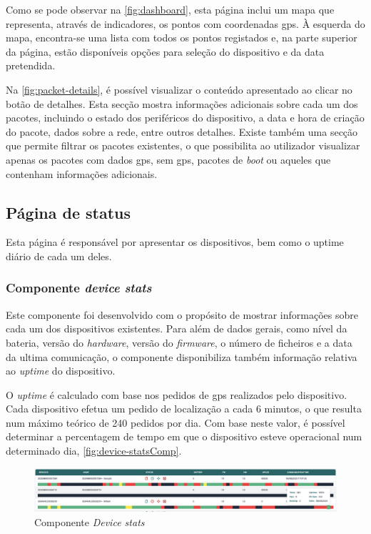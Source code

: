Como se pode observar na \autoref{fig:dashboard}, esta página inclui um mapa que representa, através de indicadores, os pontos com coordenadas \acs{gps}. À esquerda do mapa, encontra-se uma lista com todos os pontos registados e, na parte superior da página, estão disponíveis opções para seleção do dispositivo e da data pretendida.

Na \autoref{fig:packet-details}, é possível visualizar o conteúdo apresentado ao clicar no botão de detalhes. Esta secção mostra informações adicionais sobre cada um dos pacotes, incluindo o estado dos periféricos do dispositivo, a data e hora de criação do pacote, dados sobre a rede, entre outros detalhes. Existe também uma secção que permite filtrar os pacotes existentes, o que possibilita ao utilizador visualizar apenas os pacotes com dados \acs{gps}, sem \acs{gps}, pacotes de \textit{boot} ou aqueles que contenham informações adicionais.

\subsection{Página de status}\label{sec:interfaceStatus} %
Esta página é responsável por apresentar os dispositivos, bem como o uptime diário de cada um deles.

\subsubsection{\textbf{Componente \textit{device stats}}}
Este componente foi desenvolvido com o propósito de mostrar informações sobre cada um dos dispositivos existentes. Para além de dados gerais, como nível da bateria, versão do \textit{hardware}, versão do \textit{firmware}, o número de ficheiros e a data da ultima comunicação, o componente disponibiliza também informação relativa ao \textit{uptime} do dispositivo.

O \textit{uptime} é calculado com base nos pedidos de \acs{gps} realizados pelo dispositivo. Cada dispositivo efetua um pedido de localização a cada 6 minutos, o que resulta num máximo teórico de 240 pedidos por dia. Com base neste valor, é possível determinar a percentagem de tempo em que o dispositivo esteve operacional num determinado dia, \autoref{fig:device-statsComp}.

\begin{figure}[h!]
    \centering
    \includegraphics[width=\textwidth]{figs/device-stats.png}
    \caption{Componente \textit{Device stats}}
    \label{fig:device-statsComp}
\end{figure}

